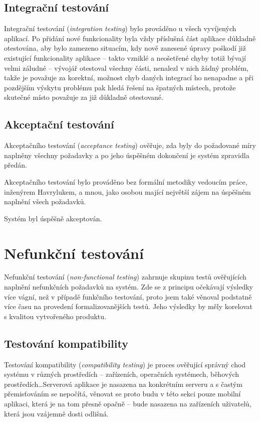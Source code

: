 \subsection{Integrační testování}
Integrační testování (\textit{integration testing}) bylo prováděno u všech vyvíjených aplikací. Po přidání nové funkcionality byla vždy příslušná část aplikace důkladně otestována, aby bylo zamezeno situacím, kdy nově zanesené úpravy poškodí již existující funkcionality aplikace -- takto vzniklé a neošetřené chyby totiž bývají velmi záludné -- vývojář otestoval všechny části, nenalezl v nich žádný problém, takže je považuje za korektní, možnost chyb daných integrací ho nenapadne a při pozdějším výskytu problému pak hledá řešení na špatných místech, protože skutečné místo považuje za již důkladně otestované.

\subsection{Akceptační testování}
Akceptačního testování (\textit{acceptance testing}) ověřuje, zda byly do požadované míry naplněny všechny požadavky a po jeho úspěšném dokončení je systém zpravidla předán.

Akceptačního testování bylo prováděno bez formální metodiky vedoucím práce, inženýrem Havrylukem, a mnou, jako osobou mající největší zájem na úspěšném naplnění všech požadavků.

Systém byl úspěšně akceptován.


\section{Nefunkční testování}
Nefunkční testování (\textit{non-functional testing}) zahrnuje skupinu testů ověřujících naplnění nefunkčních požadavků na systém. Zde se z principu očekávají výsledky více vágní, než v případě funkčního testování, proto jsem také věnoval podstatně více času na provedení formalizovanějších testů. Jeho výsledky by měly korelovat s kvalitou vytvořeného produktu.

\subsection{Testování kompatibility}
\label{sec:test:compat}
Testování kompatibility (\textit{compatibility testing}) je proces ověřující správný chod systému v různých prostředích -- zařízeních, operačních systémech, běhových prostředích\dots Serverová aplikace je nasazena na konkrétním serveru a s častým přemisťováním se nepočítá, věnovat se proto budu v této sekci pouze mobilní aplikaci, která je na tom přesně opačně -- bude nasazena na zařízeních uživatelů, která jsou vzájemně dosti odlišná.

